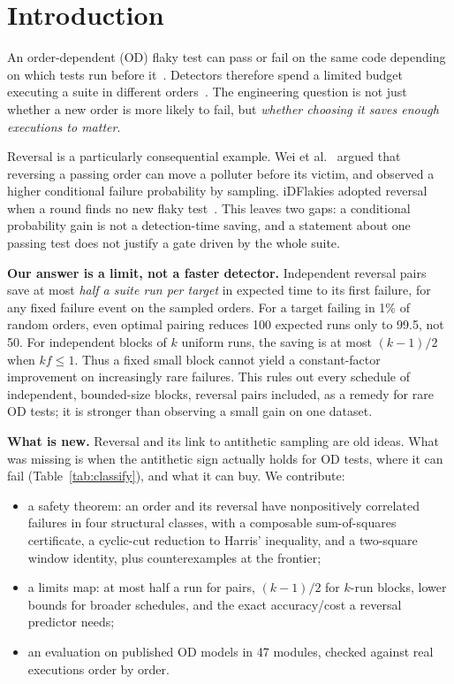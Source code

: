 \documentclass[conference,letterpaper]{IEEEtran}
\theoremstyle{definition}
\begin{document}
\section{Introduction}
An order-dependent (OD) flaky test can pass or fail on the same code depending on which tests run before it~\cite{luo2014empirical,parry2021survey}. Detectors therefore spend a limited budget executing a suite in different orders~\cite{zhang2014dtdetector,lam2019idflakies,hashemi2025js}. The engineering question is not just whether a new order is more likely to fail, but \emph{whether choosing it saves enough executions to matter}.

Reversal is a particularly consequential example. Wei et al.~\cite{wei2021tacas} argued that reversing a passing order can move a polluter before its victim, and observed a higher conditional failure probability by sampling. iDFlakies adopted reversal when a round finds no new flaky test~\cite{wei2021tacas,idflakiesrepo}. This leaves two gaps: a conditional probability gain is not a detection-time saving, and a statement about one passing test does not justify a gate driven by the whole suite.

\textbf{Our answer is a limit, not a faster detector.} Independent reversal pairs save at most \emph{half a suite run per target} in expected time to its first failure, for any fixed failure event on the sampled orders. For a target failing in 1\% of random orders, even optimal pairing reduces 100 expected runs only to 99.5, not 50. For independent blocks of $k$ uniform runs, the saving is at most $(k-1)/2$ when $kf\le1$. Thus a fixed small block cannot yield a constant-factor improvement on increasingly rare failures. This rules out every schedule of independent, bounded-size blocks, reversal pairs included, as a remedy for rare OD tests; it is stronger than observing a small gain on one dataset.

\textbf{What is new.} Reversal and its link to antithetic sampling are old ideas. What was missing is when the antithetic sign actually holds for OD tests, where it can fail (Table~\ref{tab:classify}), and what it can buy. We contribute:
\begin{itemize}
\item a safety theorem: an order and its reversal have nonpositively correlated failures in four structural classes, with a composable sum-of-squares certificate, a cyclic-cut reduction to Harris' inequality, and a two-square window identity, plus counterexamples at the frontier;
\item a limits map: at most half a run for pairs, $(k-1)/2$ for $k$-run blocks, lower bounds for broader schedules, and the exact accuracy/cost a reversal predictor needs;
\item an evaluation on \NTargets{} published OD models in 47 modules, checked against real executions order by order.
\end{itemize}
\end{document}
